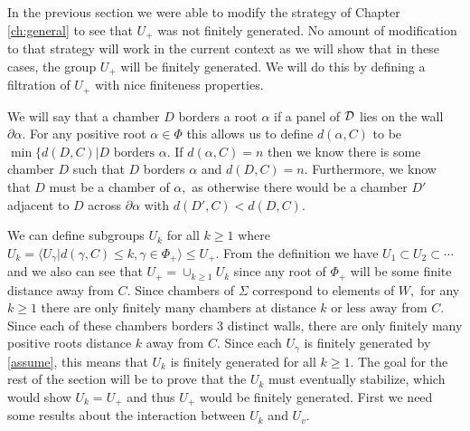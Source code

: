 \documentclass[class=book, crop=false]{standalone}
\begin{document}
In the previous section we were able to modify the strategy of Chapter \ref{ch:general} to see that $U_+$ was not finitely generated. No amount of modification to that strategy will work in the current context as we will show that in these cases, the group $U_+$ will be finitely generated. We will do this by defining a filtration of $U_+$ with nice finiteness properties.

We will say that a chamber $D$ borders a root $\alpha$ if a panel of $\mathcal{D}$ lies on the wall $\partial \alpha.$ For any positive root $\alpha\in \Phi$ this allows us to define $d(\alpha,C)$ to be $\min\{d(D,C)|D\text{ borders }\alpha.$ If $d(\alpha,C)=n$ then we know there is some chamber $D$ such that $D$ borders $\alpha$ and $d(D,C)=n.$ Furthermore, we know that $D$ must be a chamber of $\alpha,$ as otherwise there would be a chamber $D'$ adjacent to $D$ across $\partial\alpha$ with $d(D',C)<d(D,C).$ 

	We can define subgroups $U_k$ for all $k\ge 1$ where $U_k=\langle U_\gamma|d(\gamma,C)\le k,\gamma\in \Phi_+\rangle\le U_+.$ From the definition we have $U_1\subset U_2\subset \cdots$ and we also can see that $U_+=\cup_{k\ge 1}U_k$ since any root of $\Phi_+$ will be some finite distance away from $C.$ Since chambers of $\Sigma$ correspond to elements of $W,$ for any $k\ge 1$ there are only finitely many chambers at distance $k$ or less away from $C.$ Since each of these chambers borders 3 distinct walls, there are only finitely many positive roots distance $k$ away from $C.$ Since each $U_\gamma$ is finitely generated by \eqref{assume}, this means that $U_k$ is finitely generated for all $k\ge 1.$ The goal for the rest of the section will be to prove that the $U_k$ must eventually stabilize, which would show $U_k=U_+$ and thus $U_+$ would be finitely generated. First we need some results about the interaction between $U_k$ and $U_v.$
\end{document}
